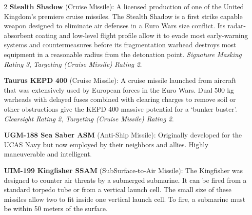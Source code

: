\documentclass[
  oneside]{article}
\begin{document}
\begin{multicols}{2}
\textbf{Stealth Shadow} (Cruise Missile): A
licensed production of one of the United Kingdom's
premiere cruise missiles. The Stealth Shadow is a
first strike capable weapon designed to eliminate
air defenses in a Euro Wars size conflict. Its
radar-absorbent coating and low-level flight
profile allow it to evade most early-warning
systems and countermeasures before its
fragmentation warhead destroys most equipment in a
reasonable radius from the detonation point.
\emph{Signature Masking Rating 3}, \emph{Targeting
(Cruise Missile) Rating 2}.

\textbf{Taurus KEPD 400} (Cruise Missile): A
cruise missile launched from aircraft that was
extensively used by European forces in the Euro
Wars. Dual 500 kg warheads with delayed fuses
combined with clearing charges to remove soil or
other obstructions give the KEPD 400 massive
potential for a `bunker buster'. \emph{Clearsight
Rating 2}, \emph{Targeting (Cruise Missile) Rating
2}.

\textbf{UGM-188 Sea Saber ASM} (Anti-Ship
Missile): Originally developed for the UCAS Navy
but now employed by their neighbors and allies.
Highly maneuverable and intelligent.

\textbf{UIM-199 Kingfisher SSAM}
(SubSurface-to-Air Missile): The Kingfisher was
designed to counter air threats by a submerged
submarine. It can be fired from a standard torpedo
tube or from a vertical launch cell. The small
size of these missiles allow two to fit inside one
vertical launch cell. To fire, a submarine must be
within 50 meters of the surface.

\end{multicols}
\end{document}
